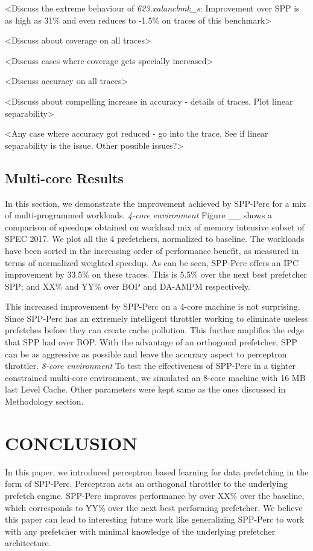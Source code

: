 \documentclass{sig-alternate}
\begin{document}
<Discuss the extreme behaviour of \textit{623.xalancbmk\_s}: Improvement over SPP is as high as 31\% and even reduces to -1.5\% on traces of this benchmark>

<Discuss about coverage on all traces>

<Discuss cases where coverage gets specially increased>

<Discuss accuracy on all traces>

<Discuss about compelling increase in accuracy - details of traces. Plot linear separability>

<Any case where accuracy got reduced - go into the trace. See if linear separability is the issue. Other possible issues?>


\subsection{Multi-core Results}
In this section, we demonstrate the improvement achieved by SPP-Perc for a mix of multi-programmed workloads. 
\newline \newline
\textit{4-core environment}
Figure \_\_ shows a comparison of speedups obtained on workload mix of memory intensive subset of SPEC 2017. We plot all the 4 prefetchers, normalized to baseline. The workloads have been sorted in the increasing order of performance benefit, as measured in terms of normalized weighted speedup. As can be seen, SPP-Perc offers an IPC improvement by 33.5\% on these traces. This is 5.5\% over the next best prefetcher SPP; and XX\% and YY\% over BOP and DA-AMPM respectively.

This increased improvement by SPP-Perc on a 4-core machine is not surprising. Since SPP-Perc has an extremely intelligent throttler working to eliminate useless prefetches before they can create cache pollution. This further amplifies the edge that SPP had over BOP. With the advantage of an orthogonal prefetcher, SPP can be as aggressive as possible and leave the accuracy aspect to perceptron throttler.
\newline \newline
\textit{8-core environment}
To test the effectiveness of SPP-Perc in a tighter constrained multi-core environment, we simulated an 8-core machine with 16 MB last Level Cache. Other parameters were kept same as the ones discussed in Methodology section.


\section{CONCLUSION}
In this paper, we introduced perceptron based learning for data prefetching in the form of SPP-Perc. Perceptron acts an orthogonal throttler to the underlying prefetch engine. SPP-Perc improves performance by over XX\% over the baseline, which corresponds to YY\% over the next best performing prefetcher. We believe this paper can lead to interesting future work like generalizing SPP-Perc to work with any prefetcher with minimal knowledge of the underlying prefetcher architecture.


\end{document}
